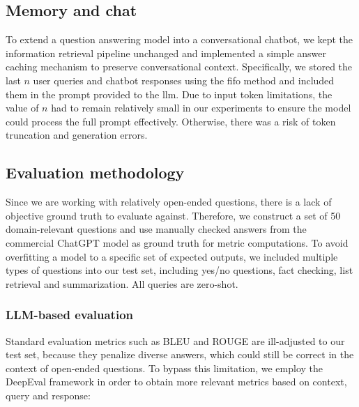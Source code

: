 \documentclass[fleqn,moreauthors,10pt]{ds_report}
\begin{document}
\subsection*{Memory and chat}

To extend a question answering model into a conversational chatbot, we kept the information retrieval pipeline unchanged and implemented a simple answer caching mechanism to preserve conversational context. Specifically, we stored the last $n$ user queries and chatbot responses using the \ac{fifo} method and included them in the prompt provided to the \ac{llm}. Due to input token limitations, the value of $n$ had to remain relatively small in our experiments to ensure the model could process the full prompt effectively. Otherwise, there was a risk of token truncation and generation errors.

\subsection*{Evaluation methodology}

Since we are working with relatively open-ended questions, there is a lack of objective ground truth to evaluate against. Therefore, we construct a set of 50 domain-relevant questions and use manually checked answers from the commercial ChatGPT model as ground truth for metric computations. To avoid overfitting a model to a specific set of expected outputs, we included multiple types of questions into our test set, including yes/no questions, fact checking, list retrieval and summarization. All queries are zero-shot.


\subsubsection*{LLM-based evaluation}

Standard evaluation metrics such as BLEU and ROUGE are ill-adjusted to our test set, because they penalize diverse answers, which could still be correct in the context of open-ended questions. To bypass this limitation, we employ the DeepEval framework \cite{deepeval} in order to obtain more relevant metrics based on context, query and response:
\end{document}
